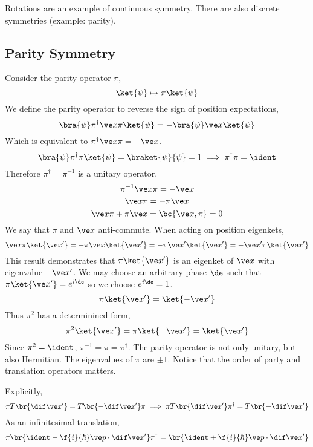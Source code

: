 \documentclass{article}
\begin{document}
Rotations are an example of continuous symmetry. There are also discrete symmetries (example: parity).

\subsection{Parity Symmetry}
Consider the parity operator $\pi$,
\[ \ket{\psi} \mapsto \pi \ket{\psi} \]
We define the parity operator to reverse the sign of position expectations,
\[ \bra{\psi} \pi^{\dagger} \ve x \pi \ket{\psi} = - \bra{\psi} \ve x \ket{\psi} \]
Which is equivalent to $\pi^{\dagger} \ve x \pi = - \ve x$.
\[ \bra{\psi} \pi^{\dagger} \pi \ket{\psi} = \braket{\psi}{\psi} = 1 \implies \pi^{\dagger} \pi = \ident\]
Therefore $\pi^{\dagger} = \pi^{-1}$ is a unitary operator.
\[ \pi^{-1} \ve x \pi = - \ve x \]
\[ \ve x \pi = - \pi \ve x \]
\[ \ve x \pi + \pi \ve x = \bc{\ve x, \pi} = 0 \]
We say that $\pi$ and $\ve x$ anti-commute. When acting on position eigenkets,
\[ \ve x \pi \ket{\ve x'} = - \pi \ve x \ket{\ve x'} = - \pi \ve x' \ket{\ve x'}= - \ve x' \pi \ket{\ve x'} \]
This result demonstrates that $\pi \ket{\ve x'}$ is an eigenket of $\ve x$ with eigenvalue $-\ve x'$. We may choose an arbitrary phase $\de$ such that $\pi \ket{\ve x'} = e^{i \de}$ so we choose $e^{i \de} = 1$.
\[ \pi \ket{\ve x'} = \ket{- \ve x'} \]
Thus $\pi^2$ has a determinined form,
\[ \pi^2 \ket{\ve x'} = \pi\ket{- \ve x'} = \ket{\ve x'} \]
Since $\pi^2 = \ident$, $\pi^{-1} = \pi = \pi^{\dagger}$. The parity operator is not only unitary, but also Hermitian. The eigenvalues of $\pi$ are $\pm 1$. Notice that the order of party and translation operators matters.
\begin{center}
\end{center}
Explicitly,
\[ \pi T\br{\dif \ve x'} = T\br{- \dif \ve x'} \pi \implies \pi T\br{\dif \ve x'} \pi^{\dagger} = T\br{- \dif \ve x'} \]
As an infinitesimal translation,
\[  \pi \br{\ident - \f{i}{\hbar} \ve p \cdot \dif \ve x'}\pi^{\dagger} = \br{\ident + \f{i}{\hbar} \ve p \cdot \dif \ve x'} \]
\end{document}
